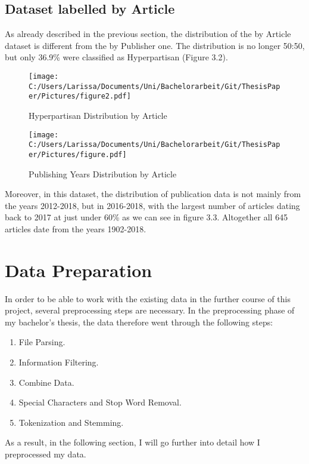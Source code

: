 \documentclass[a4paper, 11pt,titlepage,oneside,openany]{book}
\begin{document}
\subsection{Dataset labelled by Article}

As already described in the previous section, the distribution of the by Article dataset is different from the by Publisher one. The distribution is no longer 50:50, but only 36.9\% were classified as Hyperpartisan (Figure 3.2). 
\begin{figure}[t]
	\begin{minipage}{.45\linewidth}
		\texttt{[image: C:/Users/Larissa/Documents/Uni/Bachelorarbeit/Git/ThesisPaper/Pictures/figure2.pdf]}
		\caption{Hyperpartisan Distribution by Article}
	\end{minipage}
	\hspace{.1\linewidth}%
	\begin{minipage}{.45\linewidth}
	\texttt{[image: C:/Users/Larissa/Documents/Uni/Bachelorarbeit/Git/ThesisPaper/Pictures/figure.pdf]}
	\caption{Publishing Years Distribution by Article}
\end{minipage}
\end{figure}
\noindent Moreover, in this dataset, the distribution of publication data is not mainly from the years 2012-2018, but in 2016-2018, with the largest number of articles dating back to 2017 at just under 60\% as we can see in figure 3.3. Altogether all 645 articles date from the years 1902-2018.




\section{Data Preparation}
In order to be able to work with the existing data in the further course of this project, several preprocessing steps are necessary. In the preprocessing phase of my bachelor's thesis, the data therefore went through the following steps:
\begin{enumerate}
	\item File Parsing. 
	\item Information Filtering.
	\item Combine Data.
	\item Special Characters and Stop Word Removal.
	\item Tokenization and Stemming.
\end{enumerate}	
\noindent As a result, in the following section, I will go further into detail how I preprocessed my data.
\end{document}
